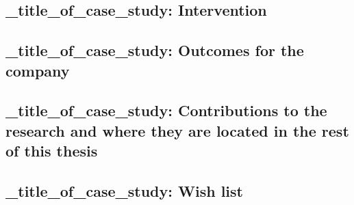 \subsection{_title_of_case_study: Intervention}

\subsection{_title_of_case_study: Outcomes for the company}

\subsection{_title_of_case_study: Contributions to the research and where they are located in the rest of this thesis}

\subsection*{_title_of_case_study: Wish list}

\clearpage

